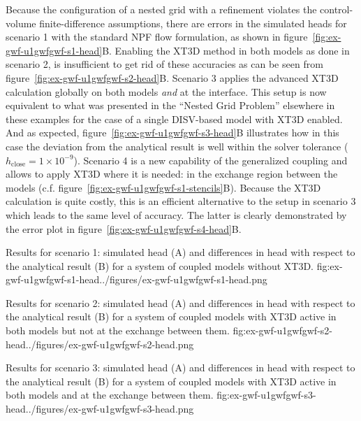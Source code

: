 Because the configuration of a nested grid with a refinement violates the control-volume finite-difference assumptions, there are errors in the simulated heads for scenario 1 with the standard NPF flow formulation, as shown in figure~\ref{fig:ex-gwf-u1gwfgwf-s1-head}B. Enabling the XT3D method in both models as done in scenario 2, is insufficient to get rid of these accuracies as can be seen from figure~\ref{fig:ex-gwf-u1gwfgwf-s2-head}B. Scenario 3 applies the advanced XT3D calculation globally on both models \emph{and} at the interface. This setup is now equivalent to what was presented in the “Nested Grid Problem” elsewhere in these examples for the case of a single DISV-based model with XT3D enabled. And as expected, figure~\ref{fig:ex-gwf-u1gwfgwf-s3-head}B illustrates how in this case the deviation from the analytical result is well within the solver tolerance ($h_\textrm{close}=1 \times 10^{-9}$). Scenario 4 is a new capability of the generalized coupling and allows to apply XT3D where it is needed: in the exchange region between the models (c.f. figure~\ref{fig:ex-gwf-u1gwfgwf-s1-stencils}B). Because the XT3D calculation is quite costly, this is an efficient alternative to the setup in scenario 3 which leads to the same level of accuracy. The latter is clearly demonstrated by the error plot in figure~\ref{fig:ex-gwf-u1gwfgwf-s4-head}B.

\begin{StandardFigure}{
                                     Results for scenario 1: simulated head (A) and differences in head with respect to the analytical result (B)  for a system of coupled models without XT3D.
                                     }{fig:ex-gwf-u1gwfgwf-s1-head}{../figures/ex-gwf-u1gwfgwf-s1-head.png}
\end{StandardFigure}  

\begin{StandardFigure}{
                                     Results for scenario 2: simulated head (A) and differences in head with respect to the analytical result (B)  for a system of coupled models with XT3D active in both models but not at the exchange between them.
                                     }{fig:ex-gwf-u1gwfgwf-s2-head}{../figures/ex-gwf-u1gwfgwf-s2-head.png}
\end{StandardFigure}

\begin{StandardFigure}{
                                     Results for scenario 3: simulated head (A) and differences in head with respect to the analytical result (B)  for a system of coupled models with XT3D active in both models and at the exchange between them.
                                     }{fig:ex-gwf-u1gwfgwf-s3-head}{../figures/ex-gwf-u1gwfgwf-s3-head.png}
\end{StandardFigure}

